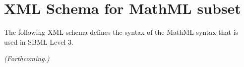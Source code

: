 
\section{XML Schema for MathML subset}
\label{apdx:mathml-subset-schema}

The following XML schema defines the syntax of the MathML syntax
that is used in SBML Level 3.

\emph{(Forthcoming.)}

% 

